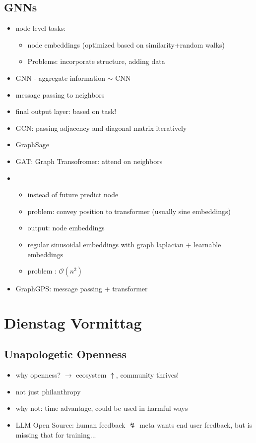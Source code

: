 \documentclass[a4paper]{article}
\begin{document}
\subsection*{GNNs}
\begin{itemize}
    \item node-level tasks:
          \begin{itemize}
              \item node embeddings (optimized based on similarity+random walks)
              \item Problems: incorporate structure, adding data
          \end{itemize}
    \item GNN - aggregate information $\sim$ CNN
    \item message passing to neighbors
    \item final output layer: based on task!
    \item GCN: passing adjacency and diagonal matrix iteratively
    \item GraphSage
    \item GAT: Graph Transofromer: attend on neighbors
    \item
          \begin{itemize}
              \item instead of future predict node
              \item problem: convey position to transformer (usually sine embeddings)
              \item output: node embeddings
              \item regular sinusoidal embeddings with graph laplacian + learnable embeddings
              \item problem : $\mathcal{O}(n^2)$
          \end{itemize}
    \item GraphGPS: message passing + transformer
\end{itemize}


\section*{Dienstag Vormittag}
\subsection*{Unapologetic Openness}
\begin{itemize}
    \item why openness? $\rightarrow$ ecosystem $\uparrow$, community thrives!
    \item not just philanthropy
    \item why not: time advantage, could be used in harmful ways
    \item LLM Open Source: human feedback $\lightning$ meta wants end user feedback, but is missing that for training...
\end{itemize}
\end{document}
